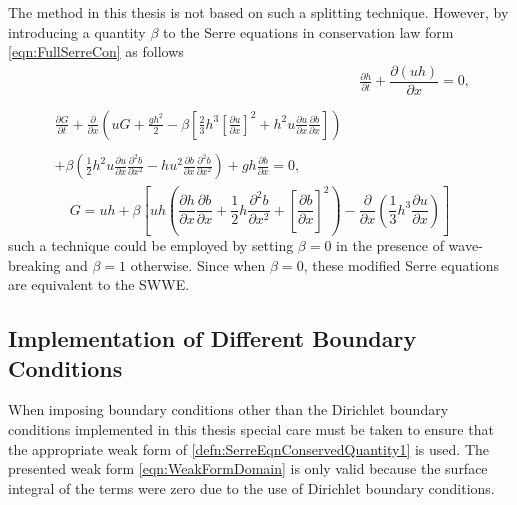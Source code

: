 The method in this thesis is not based on such a splitting technique. However, by introducing a quantity $\beta$ to the Serre equations in conservation law form \eqref{eqn:FullSerreCon} as follows
	\begin{align*}
	& \frac{\partial h}{\partial t} + \dfrac{\partial (uh)}{\partial x} = 0 ,  \\ \nonumber \\
	\begin{split}
	\frac{\partial G}{\partial t}  + \frac{\partial}{\partial x} \left( {u} G + \frac{gh^2}{2} - \beta \left[ \frac{2}{3}h^3 \left[\frac{\partial {u}}{\partial x}\right]^2 + h^2 {u}\frac{\partial {u}}{\partial x}\frac{\partial b}{\partial x} \right] \right) \\ \\ +  \beta\left( \frac{1}{2}h^2 {u} \frac{\partial {u}}{\partial x} \frac{\partial^2 b}{\partial x^2}  - h {u}^2\frac{\partial b}{\partial x}\frac{\partial^2 b}{\partial x^2} \right) + gh\frac{\partial b}{\partial x}  = 0,
	\end{split}
	\end{align*}
	\begin{equation*}
	G = uh + \beta \left[{u}h \left(\frac{\partial h}{\partial x}\frac{\partial b}{\partial x} + \frac{1}{2}h\frac{\partial^2 b}{\partial x^2} + \left[\frac{\partial b}{\partial x}\right]^2 \right) - \frac{\partial}{\partial x}\left(\frac{1}{3}h^3  \frac{\partial {u}}{\partial x}\right)\right]
	\end{equation*}
such a technique could be employed by setting $\beta = 0$ in the presence of wave-breaking and $\beta = 1$ otherwise. Since when $\beta = 0$, these modified Serre equations are equivalent to the SWWE.

\subsection{Implementation of Different Boundary Conditions}
When imposing boundary conditions other than the Dirichlet boundary conditions implemented in this thesis special care must be taken to ensure that the appropriate weak form of \eqref{defn:SerreEqnConservedQuantity1} is used. The presented weak form \eqref{eqn:WeakFormDomain} is only valid because the surface integral of the terms were zero due to the use of Dirichlet boundary conditions. 

